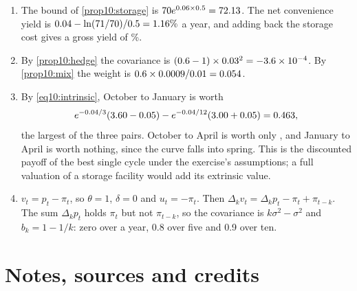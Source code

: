 \begin{chapterrefs}
\begin{enumerate}[label=\textbf{10.\arabic*}, leftmargin=*]
  \item The bound of \cref{prop10:storage} is $70e^{0.06\times0.5}=72.13$. The net convenience yield is
  $0.04-\ln(71/70)/0.5=1.16\%$ a year, and adding back the storage cost gives a gross yield of \xmGross\%.
  \item By \cref{prop10:hedge} the covariance is $(0.6-1)\times0.03^2=-3.6\times 10^{-4}$. By \cref{prop10:mix} the weight
  is $0.6\times0.0009/0.01=0.054$.
  \item By \cref{eq10:intrinsic}, October to January is worth
  \[e^{-0.04/3}(3.60-0.05)-e^{-0.04/12}(3.00+0.05)=0.463,\]
  the largest of the three pairs. October to April is worth only \xoLast, and January to April is worth
  nothing, since the curve falls into spring. This is the discounted payoff of the best single cycle under
  the exercise's assumptions; a full valuation of a storage facility would add its extrinsic value.
  \item $v_t=p_t-\pi_t$, so $\theta=1$, $\delta=0$ and $u_t=-\pi_t$. Then $\Delta_kv_t=\Delta_kp_t-\pi_t+\pi_{t-k}$.
  The sum $\Delta_kp_t$ holds $\pi_t$ but not $\pi_{t-k}$, so the covariance is $k\sigma^2-\sigma^2$ and
  $b_k=1-1/k$: zero over a year, 0.8 over five and 0.9 over ten.
\end{enumerate}

\FloatBarrier
\section{Notes, sources and credits}
\label{sec10:credits}


\end{chapterrefs}
